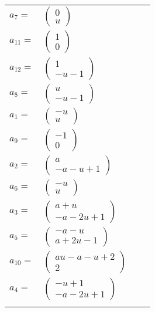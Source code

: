 \documentclass[1p]{elsarticle_modified}
\theoremstyle{definition}
\begin{document}
\begin{tabular}{m{7pt} m{180pt} m{7pt} m{180pt} }
\flushright $a_{7}=$&$\begin{pmatrix}0\\u\end{pmatrix}$ \\
\flushright $a_{11}=$&$\begin{pmatrix}1\\0\end{pmatrix}$ \\
\flushright $a_{12}=$&$\begin{pmatrix}1\\- u-1\end{pmatrix}$ \\
\flushright $a_{8}=$&$\begin{pmatrix}u\\- u-1\end{pmatrix}$ \\
\flushright $a_{1}=$&$\begin{pmatrix}- u\\u\end{pmatrix}$ \\
\flushright $a_{9}=$&$\begin{pmatrix}-1\\0\end{pmatrix}$ \\
\flushright $a_{2}=$&$\begin{pmatrix}a\\- a- u+1\end{pmatrix}$ \\
\flushright $a_{6}=$&$\begin{pmatrix}- u\\u\end{pmatrix}$ \\
\flushright $a_{3}=$&$\begin{pmatrix}a+u\\- a-2 u+1\end{pmatrix}$ \\
\flushright $a_{5}=$&$\begin{pmatrix}- a- u\\a+2 u-1\end{pmatrix}$ \\
\flushright $a_{10}=$&$\begin{pmatrix}a u- a- u+2\\2\end{pmatrix}$ \\
\flushright $a_{4}=$&$\begin{pmatrix}- u+1\\- a-2 u+1\end{pmatrix}$\\&\end{tabular}
\end{document}
